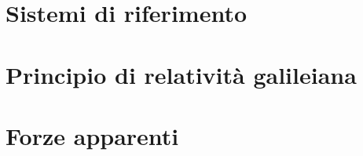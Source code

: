 \marginpar{\minitoc}

\section{Sistemi di riferimento}
\section{Principio di relatività galileiana}
\section{Forze apparenti}